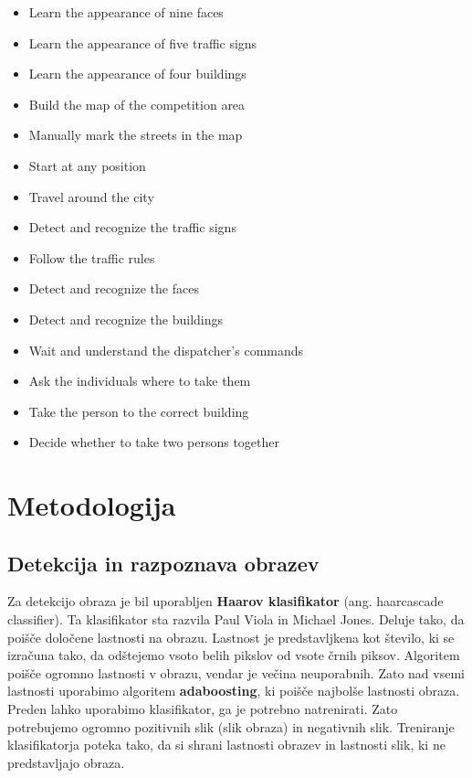 \documentclass[a4paper,11pt]{article}
\begin{document}
\begin{itemize}
	\color{green}
	\item Learn the appearance of nine faces
	\item {\color{red}Learn the appearance of five traffic signs}
	\item {\color{red}Learn the appearance of four buildings}
	\item Build the map of the competition area
	\item Manually mark the streets in the map
	\item Start at any position
	\item Travel around the city
	\item {\color{red}Detect and recognize the traffic signs}
	\item {\color{yellow}Follow the traffic rules}
	\item Detect and recognize the faces
	\item {\color{red}Detect and recognize the buildings}
	\item Wait and understand the dispatcher's commands
	\item Ask the individuals where to take them
	\item Take the person to the correct building
	\item {\color{red}Decide whether to take two persons together}
\end{itemize}

\section{Metodologija}



\pagebreak
\subsection{Detekcija in razpoznava obrazev}

Za detekcijo obraza je bil uporabljen \textbf{Haarov klasifikator} (ang. haarcascade classifier). Ta klasifikator sta razvila Paul Viola in Michael Jones. Deluje tako, da poišče določene lastnosti na obrazu. Lastnost je predstavljkena kot število, ki se izračuna tako, da odštejemo vsoto belih pikslov od vsote črnih piksov. Algoritem poišče ogromno lastnosti v obrazu, vendar je večina neuporabnih. Zato nad vsemi lastnosti uporabimo algoritem \textbf{adaboosting}, ki poišče najbolše lastnosti obraza. Preden lahko uporabimo klasifikator, ga je potrebno natrenirati. Zato potrebujemo ogromno pozitivnih slik (slik obraza) in negativnih slik. Treniranje klasifikatorja poteka tako, da si shrani lastnosti obrazev in lastnosti slik, ki ne predstavljajo obraza. 
\end{document}
